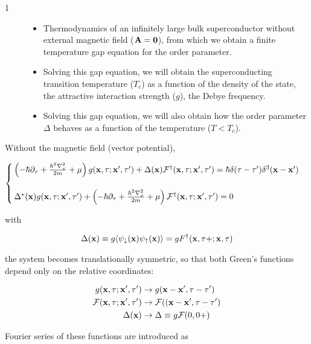 \begin{description}
\item[1] \hfill
\begin{itemize}
\item Thermodynamics of an infinitely large bulk superconductor without external magnetic field ($\bf A=0$), from which we obtain a finite temperature gap equation for the order parameter. 
\item Solving this gap equation, we will obtain the superconducting transition temperature ($T_c$) as a function of the density of the state, the attractive interaction strength ($g$), the Debye frequency. 
\item Solving this gap equation, we will also obtain how the order parameter $\Delta$ behaves as a function of the temperature ($T<T_c$). 
\end{itemize}
\end{description}

Without the magnetic field (vector potential), 

\[
\begin{cases}
\left(-\hbar\partial_\tau + \frac{\hbar^2\nabla_x^2}{2m}+\mu\right)g({\bf x},\tau;{\bf x'},\tau')+\Delta({\bf x})\mathcal{F}^\dagger({\bf x},\tau;{\bf x'},\tau') = \hbar\delta(\tau-\tau')\delta^3({\bf x}-{\bf x}')\\
\ \\
\Delta^*({\bf x})g({\bf x},\tau;{\bf x'},\tau') + \left(-\hbar\partial_\tau + \frac{\hbar^2\nabla_x^2}{2m}+\mu\right)\mathcal{F}^\dagger({\bf x},\tau;{\bf x'},\tau')  = 0
\end{cases}
\]

with

\[\Delta({\bf x}) \equiv g\langle\psi_\downarrow({\bf x})\psi_\uparrow({\bf x})\rangle = g{F}^\dagger({\bf x},\tau+;{\bf x},\tau) \]

the system becomes translationally symmetric, so that both Green's functions depend only on the relative coordinates:

\[\begin{split}
g({\bf x},\tau;{\bf x'},\tau')&\rightarrow g({\bf x-x'},\tau-\tau')\\
\mathcal{F}({\bf x},\tau;{\bf x'},\tau')&\rightarrow\mathcal{F}(({\bf x-x'},\tau-\tau')\\
\Delta({\bf x})&\rightarrow\Delta\equiv g\mathcal{F}(0,0+)
\end{split} \]

Fourier series of these functions are introduced as

